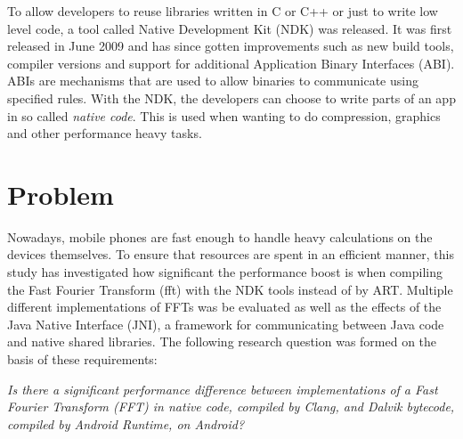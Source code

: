 
To allow developers to reuse libraries written in C or C++ or just to write low level code, a tool called Native Development Kit (NDK) was released. It was first released in June 2009 \cite{Lin2011} and has since gotten improvements such as new build tools, compiler versions and support for additional Application Binary Interfaces (ABI). ABIs are mechanisms that are used to allow binaries to communicate using specified rules. With the NDK, the developers can choose to write parts of an app in so called \emph{native code}. This is used when wanting to do compression, graphics and other performance heavy tasks.



\section{Problem}
Nowadays, mobile phones are fast enough to handle heavy calculations on the devices themselves. To ensure that resources are spent in an efficient manner, this study has investigated how significant the performance boost is when compiling the Fast Fourier Transform (\gls{fft}) with the NDK tools instead of by ART. Multiple different implementations of FFTs was be evaluated as well as the effects of the Java Native Interface (JNI), a framework for communicating between Java code and native shared libraries. The following research question was formed on the basis of these requirements:



\begin{center}
    \textit{Is there a significant performance difference between implementations of a Fast Fourier Transform (FFT) in native code, compiled by Clang, and Dalvik bytecode, compiled by Android Runtime, on Android?}
\end{center}


